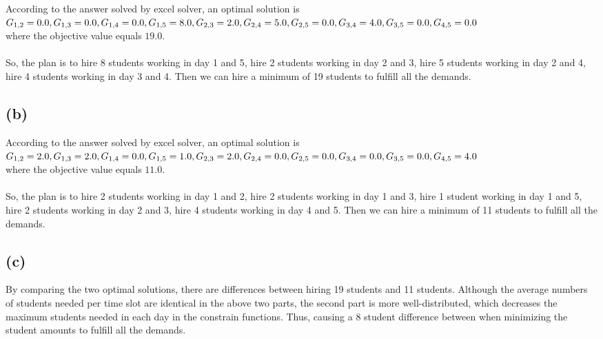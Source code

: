 \documentclass[12pt, a4paper]{article}
\begin{document}
According to the answer solved by excel solver, an optimal solution is\\
$G_{1,2} = 0.0,
G_{1,3} = 0.0,
G_{1,4} = 0.0,
G_{1,5} = 8.0,
G_{2,3} = 2.0,\\
G_{2,4} = 5.0,
G_{2,5} = 0.0,
G_{3,4} = 4.0,
G_{3,5} = 0.0,
G_{4,5} = 0.0$\\
where the objective value equals $19.0$.\\
\\
So, the plan is to hire 8 students working in day 1 and 5, hire 2 students working in day 2 and 3, hire 5 students working in day 2 and 4, hire 4 students working in day 3 and 4. Then we can hire a minimum of 19 students to fulfill all the demands.

\subsection{(b)}

According to the answer solved by excel solver, an optimal solution is\\
$G_{1,2} = 2.0,
G_{1,3} = 2.0,
G_{1,4} = 0.0,
G_{1,5} = 1.0,
G_{2,3} = 2.0,\\
G_{2,4} = 0.0,
G_{2,5} = 0.0,
G_{3,4} = 0.0,
G_{3,5} = 0.0,
G_{4,5} = 4.0$\\
where the objective value equals $11.0$.\\
\\
So, the plan is to hire 2 students working in day 1 and 2, hire 2 students working in day 1 and 3, hire 1 student working in day 1 and 5, hire 2 students working in day 2 and 3, hire 4 students working in day 4 and 5. Then we can hire a minimum of 11 students to fulfill all the demands.

\subsection{(c)}
By comparing the two optimal solutions, there are differences between hiring 19 students and 11 students. Although the average numbers of students needed per time slot are identical in the above two parts, the second part is more well-distributed, which decreases the maximum students needed in each day in the constrain functions. Thus, causing a 8 student difference between when minimizing the student amounts to fulfill all the demands.
\end{document}

